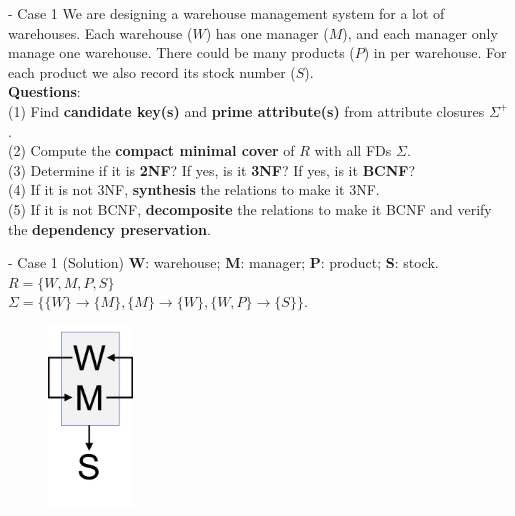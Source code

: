 


\begin{frame}[fragile]{ - Case 1}
	We are designing a warehouse management system for a lot of warehouses. Each warehouse ($W$) has one manager ($M$), and each manager only manage one warehouse. There could be many products ($P$) in per warehouse. For each product we also record its stock number ($S$).\\\vspace{10pt}
	\textbf{Questions}:\\
	(1) Find \textbf{candidate key(s)} and \textbf{prime attribute(s)} from attribute closures $\Sigma^{+}$.\\
	(2) Compute the \textbf{compact minimal cover} of $R$ with all FDs $\Sigma$.\\
	(3) Determine if it is \textbf{2NF}? If yes, is it \textbf{3NF}? If yes, is it \textbf{BCNF}?\\
	(4) If it is not 3NF, \textbf{synthesis} the relations to make it 3NF.\\
	(5) If it is not BCNF, \textbf{decomposite} the relations to make it BCNF and verify the \textbf{dependency preservation}. 
\end{frame}

\begin{frame}[fragile]{ - Case 1 (Solution)}
	\textbf{W}: warehouse; \textbf{M}: manager;
	\textbf{P}: product; \textbf{S}: stock.\\\vspace{5pt}
	$R = \{W, M, P, S\}$\\
	$\Sigma = \{\{W\} \rightarrow \{M\}, \{M\} \rightarrow \{W\},
	\{W, P\} \rightarrow \{S\}\}$.\\\vspace{15pt}
	\begin{figure}
		\includegraphics[width=0.2\textwidth, trim=0 0 0 0, clip]{t5/images/case1.png}
	\end{figure}\vspace{-5pt}
\end{frame}

